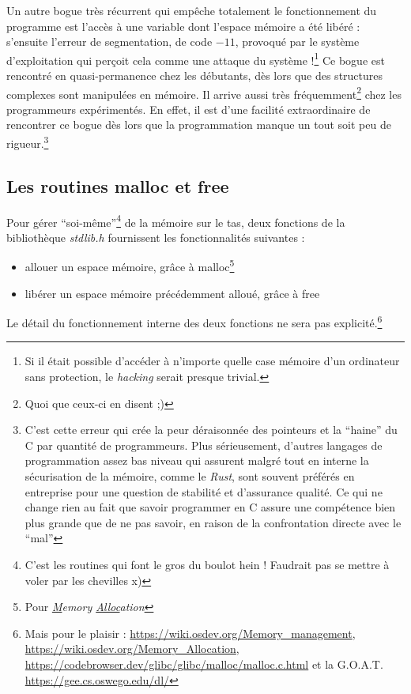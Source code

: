 \documentclass[../../../main.tex]{subfiles}
\begin{document}
Un autre bogue très récurrent qui empêche totalement le fonctionnement du programme est l'accès à une variable dont l'espace mémoire a été libéré : s'ensuite l'erreur de segmentation, de code $-11$, provoqué par le système d'exploitation qui perçoit cela comme une attaque du système !\footnote{Si il était possible d'accéder à n'importe quelle case mémoire d'un ordinateur sans protection, le \textit{hacking} serait presque trivial.} Ce bogue est rencontré en quasi-permanence chez les débutants, dès lors que des structures complexes sont manipulées en mémoire. Il arrive aussi très fréquemment\footnote{Quoi que ceux-ci en disent ;)} chez les programmeurs expérimentés. En effet, il est d'une facilité extraordinaire de rencontrer ce bogue dès lors que la programmation manque un tout soit peu de rigueur.\footnote{C'est cette erreur qui crée la peur déraisonnée des pointeurs et la ``haine'' du C par quantité de programmeurs. Plus sérieusement, d'autres langages de programmation assez bas niveau qui assurent malgré tout en interne la sécurisation de la mémoire, comme le \textit{Rust}, sont souvent préférés en entreprise pour une question de stabilité et d'assurance qualité. Ce qui ne change rien au fait que savoir programmer en C assure une compétence bien plus grande que de ne pas savoir, en raison de la confrontation directe avec le ``mal''}
\subsection{Les routines \textsf{malloc} et \textsf{free}}
\label{sub:les_routines_malloc_et_free}
Pour gérer ``soi-même''\footnote{C'est les routines qui font le gros du boulot hein ! Faudrait pas se mettre à voler par les chevilles x)} de la mémoire sur le tas, deux fonctions de la bibliothèque \textit{stdlib.h} fournissent les fonctionnalités suivantes :
\begin{itemize}
	\item allouer un espace mémoire, grâce à \textsf{malloc}\footnote{Pour \textit{\underline{M}emory \underline{Alloc}ation}}
	\item libérer un espace mémoire précédemment alloué, grâce à \textsf{free}
\end{itemize}
Le détail du fonctionnement interne des deux fonctions ne sera pas explicité.\footnote{Mais pour le plaisir : \url{https://wiki.osdev.org/Memory_management}, \url{https://wiki.osdev.org/Memory_Allocation}, \url{https://codebrowser.dev/glibc/glibc/malloc/malloc.c.html} et la G.O.A.T. \url{https://gee.cs.oswego.edu/dl/}}
 
\end{document}
